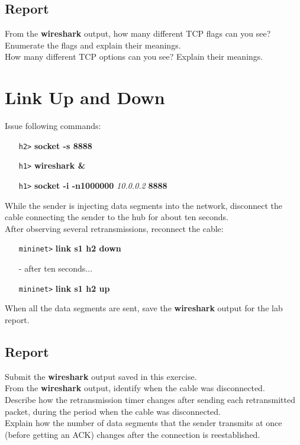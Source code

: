 \documentclass[10pt,a4paper]{article}
\numberwithin{equation}{section}
\numberwithin{figure}{section}
\numberwithin{table}{section}
\begin{document}
    \subsection*{Report}
    From the \textbf{wireshark} output, how many different TCP flags can you see? Enumerate the flags and explain their meanings. \\
    How many different TCP options can you see?
    Explain their meanings.

\section*{Link Up and Down}
    Issue following commands:
    \begin{itemize}
    	\item [\texttt{h2>}] \textbf{socket -s 8888}
    	\item [\texttt{h1>}] \textbf{wireshark \&}
    	\item [\texttt{h1>}] \textbf{socket -i -n1000000} \textit{10.0.0.2} \textbf{8888}
    \end{itemize}
    While the sender is injecting data segments into the network, disconnect the cable connecting the sender to the hub for about ten seconds. \\
    After observing several retransmissions, reconnect the cable:
    \begin{itemize}
        \item [\texttt{mininet>}] \textbf{link s1 h2 down}
        \item [-] after ten seconds...
        \item [\texttt{mininet>}] \textbf{link s1 h2 up}
    \end{itemize}
    When all the data segments are sent, save the \textbf{wireshark} output for the lab report.
    \subsection*{Report}
    Submit the \textbf{wireshark} output saved in this exercise. \\
    From the \textbf{wireshark} output, identify when the cable was disconnected. \\
    Describe how the retransmission timer changes after sending each retransmitted packet, during the period when the cable was disconnected. \\
    Explain how the number of data segments that the sender transmits at once (before getting an ACK) changes after the connection is reestablished.
\end{document}
